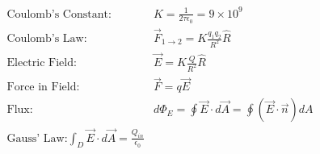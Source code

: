 \message{ !name(E&M.tex)}\documentclass[12pt]{article}
\renewcommand{\=}[1]{\stackrel{#1}{=}} %
\theoremstyle{definition}
\theoremstyle{remark}
\begin{document}
\begin{align*}  
  \textrm{Coulomb's Constant: }& K = \frac{1}{2\tau \epsilon_0} = 9 \times 10^9\\
  \textrm{Coulomb's Law: }& \vec{F}_{1\rightarrow 2} = K\frac{q_1q_2}{R^2}\hat{R}\\
  \textrm{Electric Field: }& \vec{E} = K\frac{Q}{R^2}\hat{R}\\
  \textrm{Force in Field: }& \vec{F} = q\vec{E}\\
  \textrm{Flux: }&d\Phi_E = \oint \vec{E} \cdot d \vec{A} = \oint
  (\vec{E} \cdot \vec{n})dA\\
  \textrm{Gauss' Law:} \int_{D}\vec E \cdot d\vec A = \frac{Q_{in}}{\epsilon_0}\\
  \end{align*}
\end{document}
